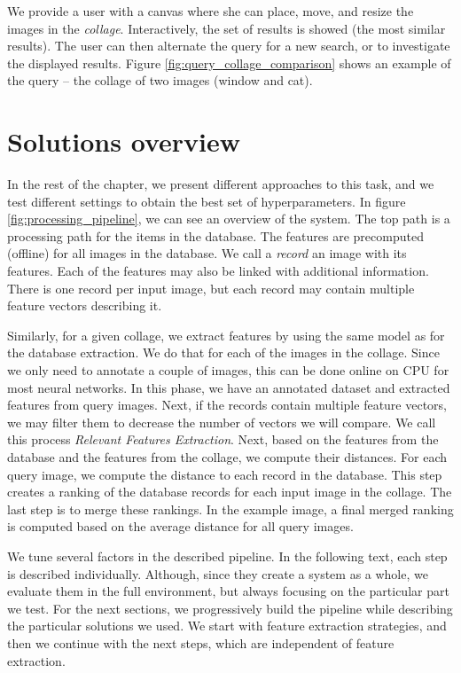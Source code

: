 We provide a user with a canvas where she can place, move, and resize the images in the \emph{collage}. Interactively, the set of results is showed (the most similar results). The user can then alternate the query for a new search, or to investigate the displayed results. Figure \ref{fig:query_collage_comparison} shows an example of the query -- the collage of two images (window and cat). 

\section{Solutions overview}

In the rest of the chapter, we present different approaches to this task, and we test different settings to obtain the best set of hyperparameters. In figure \ref{fig:processing_pipeline}, we can see an overview of the system. The top path is a processing path for the items in the database. The features are precomputed (offline) for all images in the database. We call a \emph{record} an image with its features. Each of the features may also be linked with additional information. There is one record per input image, but each record may contain multiple feature vectors describing it.

Similarly, for a given collage, we extract features by using the same model as for the database extraction. We do that for each of the images in the collage. Since we only need to annotate a couple of images, this can be done online on CPU for most neural networks. In this phase, we have an annotated dataset and extracted features from query images. Next, if the records contain multiple feature vectors, we may filter them to decrease the number of vectors we will compare. We call this process \emph{Relevant Features Extraction}. Next, based on the features from the database and the features from the collage, we compute their distances. For each query image, we compute the distance to each record in the database. This step creates a ranking of the database records for each input image in the collage. The last step is to merge these rankings. In the example image, a final merged ranking is computed based on the average distance for all query images.

We tune several factors in the described pipeline. In the following text, each step is described individually. Although, since they create a system as a whole, we evaluate them in the full environment, but always focusing on the particular part we test. For the next sections, we progressively build the pipeline while describing the particular solutions we used. We start with feature extraction strategies, and then we continue with the next steps, which are independent of feature extraction.

